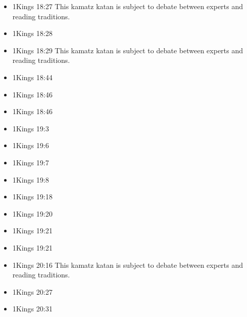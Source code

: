\documentclass[14pt]{article}
\begin{document}
\begin{multicols}{2}
\begin{itemize}
											\item 1Kings 18:27 This kamatz katan is subject to debate between experts and reading traditions.
											
											\item 1Kings 18:28
											
											\item 1Kings 18:29 This kamatz katan is subject to debate between experts and reading traditions.
											
											\item 1Kings 18:44
											
											\item 1Kings 18:46
											
											\item 1Kings 18:46
											
											\item 1Kings 19:3
											
											\item 1Kings 19:6
											
											\item 1Kings 19:7
											
											\item 1Kings 19:8
											
											\item 1Kings 19:18
											
											\item 1Kings 19:20
											
											\item 1Kings 19:21
											
											\item 1Kings 19:21
											
											\item 1Kings 20:16 This kamatz katan is subject to debate between experts and reading traditions.
											
											\item 1Kings 20:27
											
											\item 1Kings 20:31
											

\end{itemize}
\end{multicols}
\end{document}
